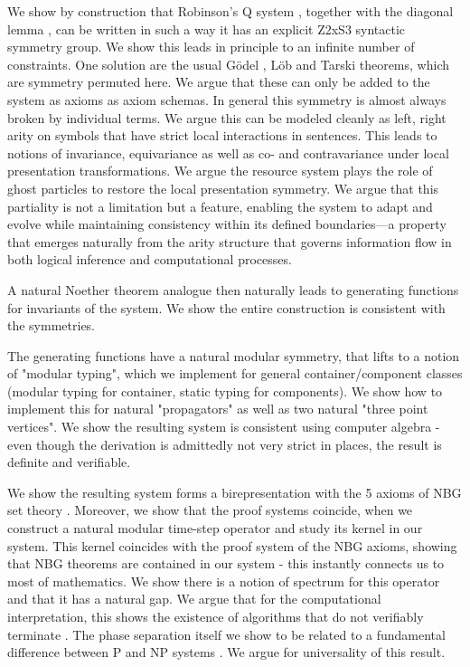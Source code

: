 We show by construction that Robinson's Q system \cite{robinson1950}, together with the diagonal lemma \cite{kleene1952}, can be written in such a way it has an explicit Z2xS3 syntactic symmetry group. We show this leads in principle to an infinite number of constraints. One solution are the usual Gödel \cite{godel1931}, Löb \cite{lob1955} and Tarski \cite{tarski1936} theorems, which are symmetry permuted here. We argue that these can only be added to the system as axioms as axiom schemas. In general this symmetry is almost always broken by individual terms. We argue this can be modeled cleanly as left, right arity on symbols that have strict local interactions in sentences. This leads to notions of invariance, equivariance as well as co- and contravariance under local presentation transformations. We argue the resource system plays the role of ghost particles to restore the local presentation symmetry. We argue that this partiality is not a limitation but a feature, enabling the system to adapt and evolve while maintaining consistency within its defined boundaries—a property that emerges naturally from the arity structure that governs information flow in both logical inference and computational processes.

A natural Noether theorem analogue then naturally leads to generating functions for invariants of the system. We show the entire construction is consistent with the symmetries. 

The generating functions have a natural modular symmetry, that lifts to a notion of "modular typing", which we implement for general container/component classes (modular typing for container, static typing for components). We show how to implement this for natural "propagators" as well as two natural "three point vertices". We show the resulting system is consistent using computer algebra -  even though the derivation is admittedly not very strict in places, the result is definite and verifiable. 

We show the resulting system forms a birepresentation with the 5 axioms of NBG set theory \cite{von_neumann1925}. Moreover, we show that the proof systems coincide, when we construct a natural modular time-step operator and study its kernel in our system. This kernel coincides with the proof system of the NBG axioms, showing that NBG theorems are contained in our system - this instantly connects us to most of mathematics. We show there is a notion of spectrum for this operator and that it has a natural gap. We argue that for the computational interpretation, this shows the existence of algorithms that do not verifiably terminate \cite{turing1936}. The phase separation itself we show to be related to a fundamental difference between P and NP systems \cite{cook1971}. We argue for universality of this result. 

